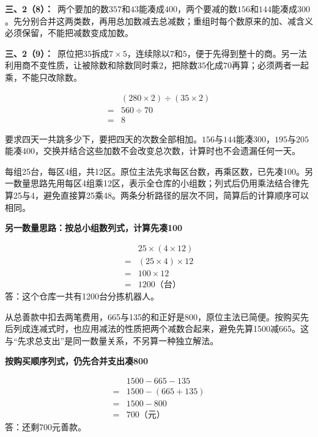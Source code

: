 \documentclass[multi=snippet,border=0pt]{standalone}
\newenvironment{snippet}[3]{\begin{minipage}{#1bp}\color{answerred}\fontsize{#2}{#3}\selectfont\raggedright}{\end{minipage}}
\begin{document}
\begin{snippet}{505}{11.5}{14}\textbf{三、2（8）：}\ 两个要加的数\(357\)和\(43\)能凑成\(400\)，两个要减的数\(156\)和\(144\)能凑成\(300\)。先分别合并这两类数，再用总加数减去总减数；重组时每个数原来的加、减含义必须保留，不能把减数变成加数。\end{snippet}
\begin{snippet}{505}{11.5}{14}\textbf{三、2（9）：}\ 原位把\(35\)拆成\(7\times5\)，连续除以\(7\)和\(5\)，便于先得到整十的商。另一法利用商不变性质，让被除数和除数同时乘\(2\)，把除数\(35\)化成\(70\)再算；必须两者一起乘，不能只改除数。\par \[\begin{aligned}&(280\times2)\div(35\times2)\\={}&560\div70\\={}&8\end{aligned}\]\end{snippet}
\begin{snippet}{505}{11.5}{14}要求四天一共跳多少下，要把四天的次数全部相加。\(156\)与\(144\)能凑\(300\)，\(195\)与\(205\)能凑\(400\)，交换并结合这些加数不会改变总次数，计算时也不会遗漏任何一天。\end{snippet}
\begin{snippet}{505}{11.5}{14}每组25台，每区4组，共12区。原位主法先求每区台数，再乘区数，已先凑100。另一数量思路先用每区4组乘12区，表示全仓库的小组数；列式后仍用乘法结合律先算25与4，避免直接算25乘48。两条分析路径的层次不同，简算后的计算顺序可以相同。\par \textbf{另一数量思路：按总小组数列式，计算先凑100}\par \[\begin{aligned}&25\times(4\times12)\\={}&(25\times4)\times12\\={}&100\times12\\={}&1200\text{（台）}\end{aligned}\]答：这个仓库一共有1200台分拣机器人。\end{snippet}
\begin{snippet}{505}{11.5}{14}从总善款中扣去两笔费用，665与135的和正好是800，原位主法已简便。按购买先后列成连减式时，也应用减法的性质把两个减数合起来，避免先算1500减665。这与“先求总支出”是同一数量关系，不另算一种独立解法。\par \textbf{按购买顺序列式，仍先合并支出凑800}\par \[\begin{aligned}&1500-665-135\\={}&1500-(665+135)\\={}&1500-800\\={}&700\text{（元）}\end{aligned}\]答：还剩700元善款。\end{snippet}
\end{document}
